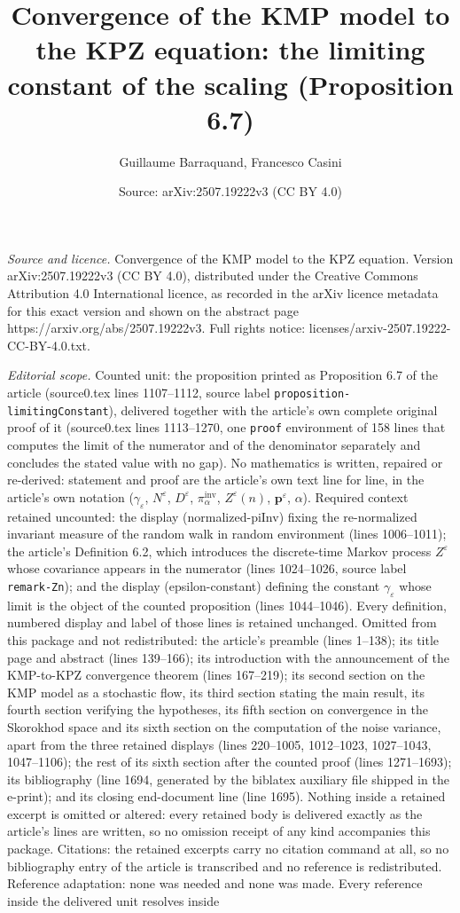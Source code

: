 \documentclass[10pt,a4paper]{amsart}
\title[The limiting constant for the KMP-to-KPZ convergence (Proposition 6.7)]{Convergence of the KMP model to the KPZ equation: the limiting constant of the scaling (Proposition 6.7)}
\author{Guillaume Barraquand, Francesco Casini}
\date{Source: arXiv:2507.19222v3 (CC BY 4.0)}
\newcommand{\eps}{\varepsilon}
\begin{document}
\maketitle

\noindent\emph{Source and licence.} Convergence of the KMP model to the KPZ equation. Version arXiv:2507.19222v3 (CC BY 4.0), distributed under the Creative Commons Attribution 4.0 International licence, as recorded in the arXiv licence metadata for this exact version and shown on the abstract page https://arxiv.org/abs/2507.19222v3. Full rights notice: licenses/arxiv-2507.19222-CC-BY-4.0.txt.\par\smallskip

\noindent\textit{Editorial scope.} Counted unit: the proposition printed as Proposition 6.7 of the article (source0.tex lines 1107--1112, source label \texttt{proposition-limitingConstant}), delivered together with the article's own complete original proof of it (source0.tex lines 1113--1270, one \texttt{proof} environment of 158 lines that computes the limit of the numerator and of the denominator separately and concludes the stated value with no gap). No mathematics is written, repaired or re-derived: statement and proof are the article's own text line for line, in the article's own notation ($\gamma_\eps$, $N^{\eps}$, $D^{\eps}$, $\pi^{\text{inv}}_{\alpha}$, $Z^{\eps}(n)$, $\mathbf{p}^{\eps}$, $\alpha$). Required context retained uncounted: the display (normalized-piInv) fixing the re-normalized invariant measure of the random walk in random environment (lines 1006--1011); the article's Definition 6.2, which introduces the discrete-time Markov process $Z^{\eps}$ whose covariance appears in the numerator (lines 1024--1026, source label \texttt{remark-Zn}); and the display (epsilon-constant) defining the constant $\gamma_\eps$ whose limit is the object of the counted proposition (lines 1044--1046). Every definition, numbered display and label of those lines is retained unchanged. Omitted from this package and not redistributed: the article's preamble (lines 1--138); its title page and abstract (lines 139--166); its introduction with the announcement of the KMP-to-KPZ convergence theorem (lines 167--219); its second section on the KMP model as a stochastic flow, its third section stating the main result, its fourth section verifying the hypotheses, its fifth section on convergence in the Skorokhod space and its sixth section on the computation of the noise variance, apart from the three retained displays (lines 220--1005, 1012--1023, 1027--1043, 1047--1106); the rest of its sixth section after the counted proof (lines 1271--1693); its bibliography (line 1694, generated by the biblatex auxiliary file shipped in the e-print); and its closing end-document line (line 1695). Nothing inside a retained excerpt is omitted or altered: every retained body is delivered exactly as the article's lines are written, so no omission receipt of any kind accompanies this package. Citations: the retained excerpts carry no citation command at all, so no bibliography entry of the article is transcribed and no reference is redistributed. Reference adaptation: none was needed and none was made. Every reference inside the delivered unit resolves inside 
\end{document}

